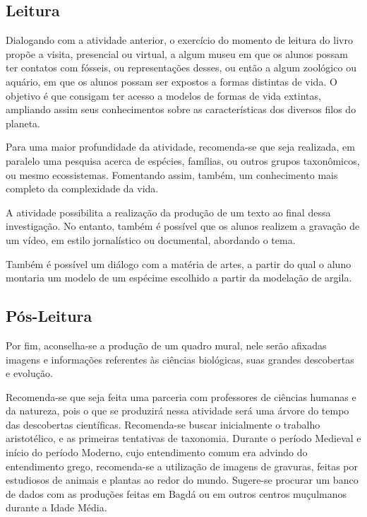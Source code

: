 \documentclass[12pt]{extarticle}
\begin{document}
\subsection{Leitura}

Dialogando com a atividade anterior, o exercício do momento
de leitura do livro propõe a visita, presencial ou virtual, a algum
museu em que os alunos possam ter contatos com fósseis, ou
representações desses, ou então a algum zoológico ou aquário, em que os
alunos possam ser expostos a formas distintas de vida. O objetivo é que
consigam ter acesso a modelos de formas de vida extintas, ampliando
assim seus conhecimentos sobre as características dos diversos filos do
planeta.

Para uma maior profundidade da atividade, recomenda-se que seja
realizada, em paralelo uma pesquisa acerca de espécies, famílias, ou
outros grupos taxonômicos, ou mesmo ecossistemas. Fomentando assim,
também, um conhecimento mais completo da complexidade da vida.

A atividade possibilita a realização da produção de um texto ao final
dessa investigação. No entanto, também é possível que os alunos realizem
a gravação de um vídeo, em estilo jornalístico ou documental, abordando
o tema.

Também é possível um diálogo com a matéria de artes, a partir do qual o
aluno montaria um modelo de um espécime escolhido a partir da modelação
de argila.

\subsection{Pós-Leitura}

Por fim, aconselha-se a produção de um quadro mural, nele
serão afixadas imagens e informações referentes às ciências biológicas,
suas grandes descobertas e evolução.

Recomenda-se que seja feita uma parceria com professores de ciências
humanas e da natureza, pois o que se produzirá nessa atividade será uma
árvore do tempo das descobertas científicas. Recomenda-se buscar
inicialmente o trabalho aristotélico, e as primeiras tentativas de
taxonomia. Durante o período Medieval e início do período Moderno, cujo
entendimento comum era advindo do entendimento grego, recomenda-se a
utilização de imagens de gravuras, feitas por estudiosos de animais e
plantas ao redor do mundo. Sugere-se procurar um banco de dados com as
produções feitas em Bagdá ou em outros centros muçulmanos durante a
Idade Média.
\end{document}
